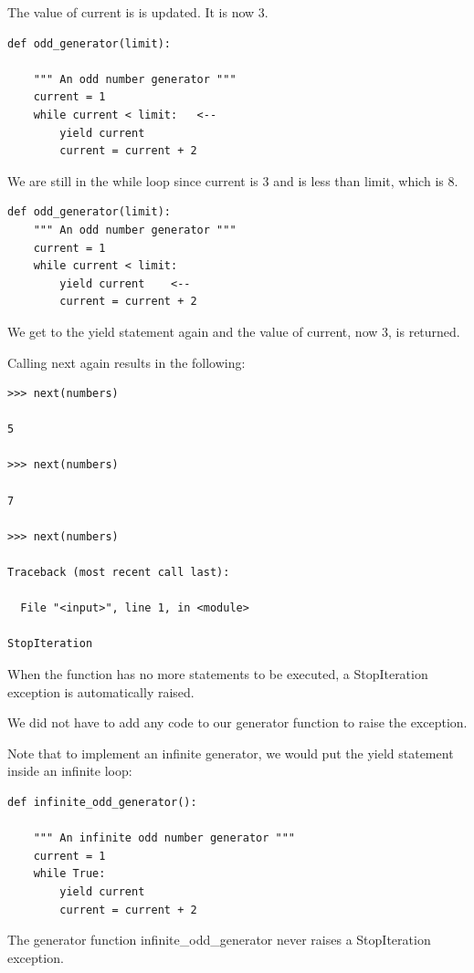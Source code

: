 \documentclass{article}
\begin{document}
The value of current is is updated.  It is now 3. 

\begin{lstlisting}
def odd_generator(limit):

    """ An odd number generator """
    current = 1
    while current < limit:   <--
        yield current
        current = current + 2
\end{lstlisting}

We are still in the while loop since current is 3 and is less than limit, which is 8.

\begin{lstlisting}
def odd_generator(limit):
    """ An odd number generator """
    current = 1
    while current < limit:
        yield current    <--
        current = current + 2
\end{lstlisting}

We get to the yield statement again and the value of current, now 3, is returned.

Calling next again results in the following:

\begin{lstlisting}
>>> next(numbers)

5

>>> next(numbers)

7

>>> next(numbers)

Traceback (most recent call last):

  File "<input>", line 1, in <module>

StopIteration
\end{lstlisting}

When the function has no more statements to be executed, a StopIteration exception is automatically raised.

We did not have to add any code to our generator function to raise the exception.

Note that to implement an infinite generator, we would put the yield statement inside an infinite loop:

\begin{lstlisting}
def infinite_odd_generator():

    """ An infinite odd number generator """
    current = 1
    while True:
        yield current
        current = current + 2
\end{lstlisting}
 
The generator function infinite{\_}odd{\_}generator never raises a StopIteration exception.
\end{document}
